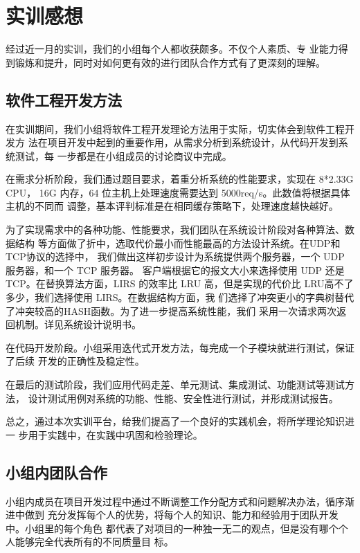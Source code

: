 \documentclass[12pt, a4paper, titlepage]{article}
\begin{document}
\section{实训感想}经过近一月的实训，我们的小组每个人都收获颇多。不仅个人素质、专
业能力得到锻炼和提升，同时对如何更有效的进行团队合作方式有了更深刻的理解。
\subsection{软件工程开发方法}
\par{在实训期间，我们小组将软件工程开发理论方法用于实际，切实体会到软件工程开发方
	法在项目开发中起到的重要作用，从需求分析到系统设计，从代码开发到系统测试，每
	一步都是在小组成员的讨论商议中完成。	
}
\par{在需求分析阶段，我们通过题目要求，着重分析系统的性能要求，实现在 8*2.33G CPU，
	16G 内存，64 位主机上处理速度需要达到 5000req/s。此数值将根据具体主机的不同而
	调整，基本评判标准是在相同缓存策略下，处理速度越快越好。
}
\par{为了实现需求中的各种功能、性能要求，我们团队在系统设计阶段对各种算法、数据结构
	等方面做了折中，选取代价最小而性能最高的方法设计系统。在UDP和TCP协议的选择中，
	我们做出这样初步设计为系统提供两个服务器，一个 UDP 服务器，和一个 TCP 服务器。
	客户端根据它的报文大小来选择使用 UDP 还是 TCP。在替换算法方面，LIRS 的效率比 
	LRU 高，但是实现的代价比 LRU高不了多少，我们选择使用 LIRS。在数据结构方面，我
	们选择了冲突更小的字典树替代了冲突较高的HASH函数。为了进一步提高系统性能，我们
	采用一次请求两次返回机制。详见系统设计说明书。
}
\par{在代码开发阶段。小组采用迭代式开发方法，每完成一个子模块就进行测试，保证了后续
	开发的正确性及稳定性。	
}
\par{在最后的测试阶段，我们应用代码走差、单元测试、集成测试、功能测试等测试方法，
	设计测试用例对系统的功能、性能、安全性进行测试，并形成测试报告。	
}
\par{总之，通过本次实训平台，给我们提高了一个良好的实践机会，将所学理论知识进一
	步用于实践中，在实践中巩固和检验理论。	
}




\subsection{小组内团队合作}
小组内成员在项目开发过程中通过不断调整工作分配方式和问题解决办法，循序渐进中做到
充分发挥每个人的优势，将每个人的知识、能力和经验用于团队开发中。小组里的每个角色
都代表了对项目的一种独一无二的观点，但是没有哪个个人能够完全代表所有的不同质量目
标。
\end{document}
